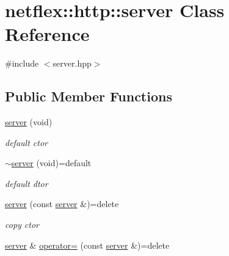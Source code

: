 \hypertarget{classnetflex_1_1http_1_1server}{}\section{netflex\+:\+:http\+:\+:server Class Reference}
\label{classnetflex_1_1http_1_1server}


{\ttfamily \#include $<$server.\+hpp$>$}

\subsection*{Public Member Functions}
\begin{DoxyCompactItemize}
\item 
\mbox{\label{classnetflex_1_1http_1_1server_af153788cc4e18c486bf9f5cfaf1d6cc5}} 
\hyperlink{classnetflex_1_1http_1_1server_af153788cc4e18c486bf9f5cfaf1d6cc5}{server} (void)
\begin{DoxyCompactList}\small\item\em default ctor \end{DoxyCompactList}\item 
\mbox{\label{classnetflex_1_1http_1_1server_a2dc5598967edffdcaabbaf48b421ec81}} 
\hyperlink{classnetflex_1_1http_1_1server_a2dc5598967edffdcaabbaf48b421ec81}{$\sim$server} (void)=default
\begin{DoxyCompactList}\small\item\em default dtor \end{DoxyCompactList}\item 
\mbox{\label{classnetflex_1_1http_1_1server_ac9ba1d17e987a083f1e4865ed13d3b98}} 
\hyperlink{classnetflex_1_1http_1_1server_ac9ba1d17e987a083f1e4865ed13d3b98}{server} (const \hyperlink{classnetflex_1_1http_1_1server}{server} \&)=delete
\begin{DoxyCompactList}\small\item\em copy ctor \end{DoxyCompactList}\item 
\mbox{\label{classnetflex_1_1http_1_1server_a9bca5e45a63350039f6af97245129c5a}} 
\hyperlink{classnetflex_1_1http_1_1server}{server} \& \hyperlink{classnetflex_1_1http_1_1server_a9bca5e45a63350039f6af97245129c5a}{operator=} (const \hyperlink{classnetflex_1_1http_1_1server}{server} \&)=delete

\end{DoxyCompactItemize}
